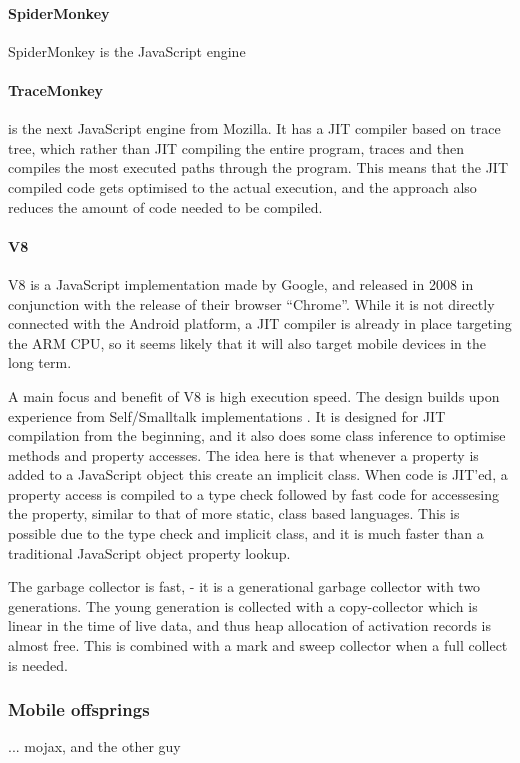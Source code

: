 \documentclass[11pt]{report}
\begin{document}
\paragraph{SpiderMonkey}
\label{spidermonkey}
SpiderMonkey \cite{spidermonkey} is the JavaScript engine 

\paragraph{TraceMonkey} is the next JavaScript engine from Mozilla.
It has a JIT compiler based on trace tree\cite{trace-tree}, 
which rather than JIT compiling the entire program,
traces and then compiles the most executed paths through the program.
This means that the JIT compiled code gets optimised to the actual execution,
and the approach also reduces the amount of code needed to be compiled.

\paragraph{V8} V8 \cite{v8} is a JavaScript implementation made by Google, and released in 2008 in conjunction with the release of their browser ``Chrome''. 
While it is not directly connected with the Android platform, a JIT compiler is already in place targeting the ARM CPU, so it seems likely that it will also target mobile devices in the long term.

A main focus and benefit of V8 is high execution speed.
The design builds upon experience from Self/Smalltalk implementations \cite{articles-before-v8}.
It is designed for JIT compilation from the beginning, and it also does some class inference to optimise methods and property accesses.
The idea here is that whenever a property is added to a JavaScript object this create an implicit class. When code is JIT'ed, a property access is compiled to a type check followed by fast code for accessesing the property, similar to that of more static, class based languages. This is possible due to the type check and implicit class, and it is much faster than a traditional JavaScript object property lookup.

The garbage collector is fast, - it is a generational garbage collector with two generations. The young generation is collected with a copy-collector which is linear in the time of live data, and thus heap allocation of activation records is almost free. 
This is combined with a mark and sweep collector when a full collect is needed.

\subsubsection{Mobile offsprings}
... mojax, and the other guy
\end{document}
